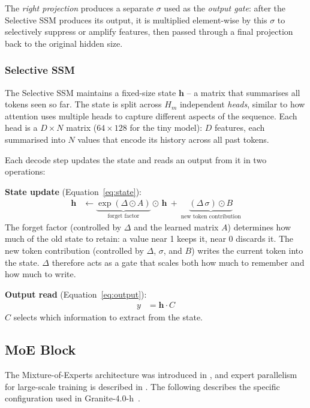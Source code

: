 The \emph{right projection} produces a separate $\sigma$ used as the \emph{output gate}: after the Selective SSM produces its output, it is multiplied element-wise by this $\sigma$ to selectively suppress or amplify features, then passed through a final projection back to the original hidden size.

\subsubsection{Selective SSM}

The Selective SSM maintains a fixed-size state $\mathbf{h}$ -- a matrix that summarises all tokens seen so far. The state is split across $H_m$ independent \emph{heads}, similar to how attention uses multiple heads to capture different aspects of the sequence. Each head is a $D \times N$ matrix ($64 \times 128$ for the tiny model): $D$ features, each summarised into $N$ values that encode its history across all past tokens.

Each decode step updates the state and reads an output from it in two operations:

\textbf{State update} (Equation~\ref{eq:state}):
\begin{align}
  \mathbf{h} &\leftarrow \underbrace{\exp(\Delta \odot A)}_{\text{forget factor}} \odot\, \mathbf{h}\ +\ \underbrace{(\Delta\,\sigma) \odot B}_{\text{new token contribution}} \label{eq:state}
\end{align}
The forget factor (controlled by $\Delta$ and the learned matrix $A$) determines how much of the old state to retain: a value near 1 keeps it, near 0 discards it. The new token contribution (controlled by $\Delta$, $\sigma$, and $B$) writes the current token into the state. $\Delta$ therefore acts as a gate that scales both how much to remember and how much to write.

\textbf{Output read} (Equation~\ref{eq:output}):
\begin{align}
  y &= \mathbf{h} \cdot C \label{eq:output}
\end{align}
$C$ selects which information to extract from the state.

\subsection{MoE Block}
\label{sec:ep-moe}

The Mixture-of-Experts architecture was introduced in \citep{shazeer2017outrageously}, and expert parallelism for large-scale training is described in \citep{lepikhin2021gshard}. The following describes the specific configuration used in Granite-4.0-h~\citep{ibmgranite2025tiny,ibmgranite2025small}.

